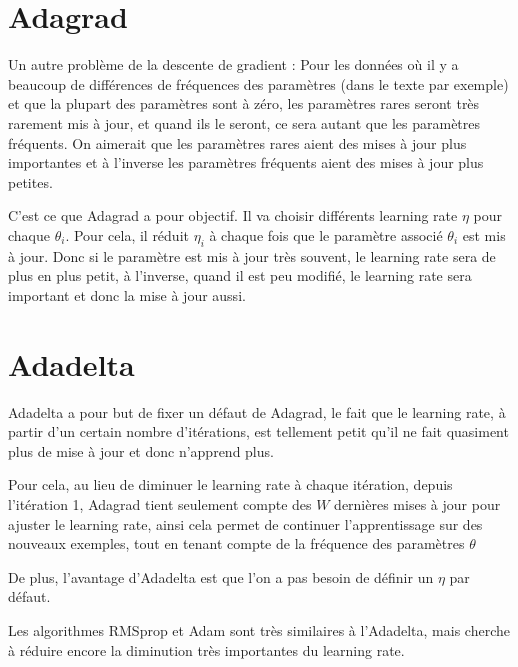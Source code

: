 \documentclass[a4paper]{article}
\begin{document}
\section{Adagrad}

Un autre problème de la descente de gradient : Pour les données où il y a beaucoup de différences de fréquences des paramètres (dans le texte par exemple) et que la plupart des paramètres sont à zéro, les paramètres rares seront très rarement mis à jour, et quand ils le seront, ce sera autant que les paramètres fréquents. On aimerait que les paramètres rares aient des mises à jour plus importantes et à l'inverse les paramètres fréquents aient des mises à jour plus petites.

C'est ce que Adagrad a pour objectif. Il va choisir différents learning rate $\eta$ pour chaque $\theta_i$. Pour cela, il réduit $\eta_i$ à chaque fois que le paramètre associé $\theta_i$ est mis à jour. Donc si le paramètre est mis à jour très souvent, le learning rate sera de plus en plus petit, à l'inverse, quand il est peu modifié, le learning rate sera important et donc la mise à jour aussi. 

\section{Adadelta}

Adadelta a pour but de fixer un défaut de Adagrad, le fait que le learning rate, à partir d'un certain nombre d'itérations, est tellement petit qu'il ne fait quasiment plus de mise à jour et donc n'apprend plus.

Pour cela, au lieu de diminuer le learning rate à chaque itération, depuis l'itération 1, Adagrad tient seulement compte des $W$ dernières mises à jour pour ajuster le learning rate, ainsi cela permet de continuer l'apprentissage sur des nouveaux exemples, tout en tenant compte de la fréquence des paramètres $\theta$

De plus, l'avantage d'Adadelta est que l'on a pas besoin de définir un $\eta$ par défaut.

Les algorithmes RMSprop et Adam sont très similaires à l'Adadelta, mais cherche à réduire encore la diminution très importantes du learning rate.
\end{document}
